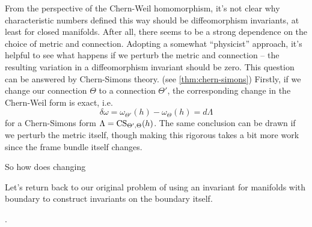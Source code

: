 From the perspective of the Chern-Weil homomorphism, it's not clear why
characteristic numbers defined this way should be diffeomorphism invariants, at least for closed manifolds. After all, there seems to be a strong dependence on the choice of metric and connection.
Adopting a somewhat ``physicist'' approach, it's helpful to see what happens if we perturb the metric and connection -- the resulting variation in a diffeomorphism invariant should be zero.
This question can be answered by Chern-Simons theory. (see \cref{thm:chern-simons}) Firstly, if we change our connection $\Theta$ to a connection $\Theta'$, the corresponding change in the Chern-Weil form is exact, i.e.
\[
	\delta \omega = \omega_{\Theta'}(h) - \omega_{\Theta}(h) = d\Lambda
\]
for a Chern-Simons form $\Lambda = {\operatorname{CS}}_{\Theta',\Theta}(h)$. The same conclusion can be drawn if we perturb the metric itself, though making this rigorous takes a bit more work since the frame bundle itself changes.
\begin{remark}
\end{remark}
So how does changing



Let's return back to our original problem of using an invariant for manifolds with boundary to construct invariants on the boundary itself.


\bigskip

\begin{remark}
	 \cite{witten1985global}.
\end{remark}


